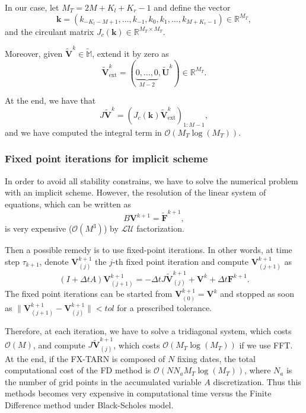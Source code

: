 In our case, let $M_T = 2M+K_l+K_r-1$ and define the vector
$$\mathbf{k} = (k_{-K_l-M+1},\ldots,k_{-1},k_0,k_1,\ldots,k_{M+K_r-1})\in\mathbb{R}^{M_T},$$
and the circulant matrix $J_c(\mathbf{k})\in\mathbb{R}^{M_T\times M_T}$.

Moreover, given $\mathbf{\tilde{V}}^k\in\mathbb{\tilde{M}}$, extend it by zero as
$$\mathbf{\tilde{V}}^k_{\text{ext}}=(\underbrace{0,\ldots,0}_{M-2},\mathbf{\tilde{U}}^k)\in \mathbb{R}^{M_T}.$$

At the end, we have that 
$$J\mathbf{\tilde{V}}^k = \left(J_c(\mathbf{k})\mathbf{\tilde{V}}^k_\text{ext}\right)_{1:M-1},$$
and we have computed the integral term in $\mathcal{O}(M_T\log(M_T))$.

\subsubsection{Fixed point iterations for implicit scheme}

In order to avoid all stability constrains, we have to solve the numerical problem with an implicit scheme. However, the resolution of the linear system of equations, which can be written as
$$B\mathbf{V}^{k+1}=\mathbf{\tilde{F}}^{k+1},$$
is very expensive ($\mathcal{O}(M^3)$) by $\mathcal{LU}$ factorization.

Then a possible remedy is to use fixed-point iterations. In other words, at time step $\tau_{k+1}$, denote $\mathbf{V}^{k+1}_{(j)}$ the $j$-th fixed point iteration and compute $\mathbf{V}^{k+1}_{(j+1)}$ as
$$(I+\Delta t A)\mathbf{V}^{k+1}_{(j+1)} = -\Delta t J\mathbf{\tilde{V}}^{k+1}_{(j)}+\mathbf{V}^k + \Delta t \mathbf{F}^{k+1}.$$
The fixed point iterations can be started from $\mathbf{V}^{k+1}_{(0)}=\mathbf{V}^k$ and stopped as soon as $\parallel\mathbf{V}^{k+1}_{(j+1)}-\mathbf{V}^{k+1}_{(j)}\parallel < tol$ for a prescribed tolerance.

Therefore, at each iteration, we have to solve a tridiagonal system, which costs $\mathcal{O}(M)$, and compute $J\mathbf{\tilde{V}}^{k+1}_{(j)}$, which costs $\mathcal{O}(M_T \log(M_T))$ if we use FFT. At the end, if the FX-TARN is composed of $N$ fixing dates, the total computational cost of the FD method is $\mathcal{O}(N N_a M_T\log(M_T))$, where $N_a$ is the number of grid points in the accumulated variable $A$ discretization. Thus this methods becomes very expensive in computational time versus the Finite Difference method under Black-Scholes model.

